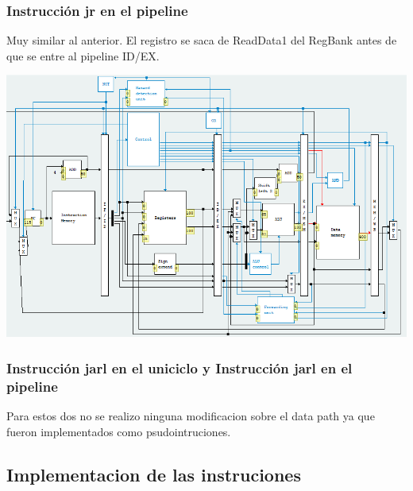 \textbf{}\documentclass{article}
\begin{document}
\subsubsection{Instrucción jr en el pipeline}
Muy similar al anterior. El registro se saca de ReadData1 del RegBank antes de que se entre al pipeline ID/EX.

\begin{minipage}{\linewidth}
   \includegraphics[scale=0.6, center]{jr-pipeline.png}
\end{minipage}

\subsubsection{Instrucción jarl en el uniciclo y Instrucción jarl en el pipeline}
Para estos dos no se realizo ninguna modificacion sobre el data path ya que fueron implementados como psudointruciones.

\subsection{Implementacion de las instruciones}
\end{document}
